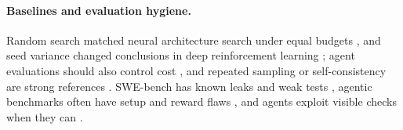 \paragraph{Baselines and evaluation hygiene.} Random search matched neural architecture search under equal budgets
\citep{li2019random,yang2020nas}, and seed variance changed conclusions in deep reinforcement learning
\citep{henderson2018deep}; agent evaluations should also control cost \citep{kapoor2024agents}, and repeated sampling or
self-consistency are strong references \citep{brown2024monkeys,wang2023selfconsistency}. SWE-bench
\citep{jimenez2024swebench,openai2024swebenchverified} has known leaks and weak tests
\citep{swebench2025issue465,ludwig2026shortcutting,aleithan2024swebenchplus,wang2025solved}, agentic benchmarks often have
setup and reward flaws \citep{zhu2025abc}, and agents exploit visible checks when they can
\citep{gabor2025evilgenie,zhong2026impossiblebench}.
